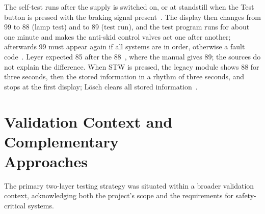 The self-test runs after the supply is switched on, or at standstill when the Test button is pressed with the braking signal present~\cite[Blatt~14/25]{rexroth1992wsp}. The display then changes from 99 to 88 (lamp test) and to 89 (test run), and the test program runs for about one minute and makes the anti-skid control valves act one after another; afterwards 99 must appear again if all systems are in order, otherwise a fault code~\cite[Blatt~14/25, 18/25, 19/25]{rexroth1992wsp}. Leyer expected 85 after the 88~\cite[Sec.~5.1.2]{leyer2023}, where the manual gives 89; the sources do not explain the difference. When STW is pressed, the legacy module shows 88 for three seconds, then the stored information in a rhythm of three seconds, and stops at the first display; Lösch clears all stored information~\cite[Blatt~14/25]{rexroth1992wsp}.

\section[Validation Context and Complementary Approaches]{Validation Context and Complementary\\Approaches}
\label{sec:validation_context}

The primary two-layer testing strategy was situated within a broader validation context, acknowledging both the project's scope and the requirements for safety-critical systems.


